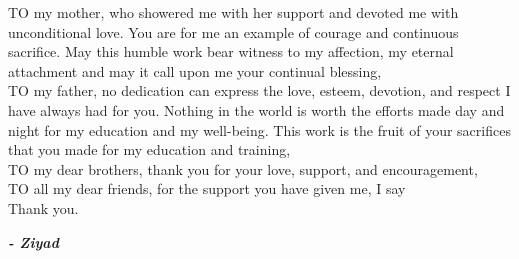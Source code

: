 \dedicace

\begin{fquote}
\begin{center}
\large{

\uppercase{To} my mother, who showered me with her support and devoted me with unconditional love. You are for me an example of courage and continuous sacrifice. May this humble work bear witness to my affection, my eternal attachment and may it call upon me your continual blessing,\\[12pt]
\uppercase{To} my father, no dedication can express the love, esteem, devotion, and respect I have always had for you. Nothing in the world is worth the efforts made day and night for my education and my well-being. This work is the fruit of your sacrifices that you made for my education and training,\\[12pt]
\uppercase{To} my dear brothers, thank you for your love, support, and encouragement,\\[12pt]
\uppercase{To} all my dear friends, for the support you have given me, I say\\[12pt]
Thank you.
}
\end{center}
\bigskip
\medskip
\end{fquote}

\begin{adjustwidth}{2cm}{1cm}
\hspace*{\fill} \textbf{\textit{\large{- Ziyad}}}
\end{adjustwidth}

\clearpage
